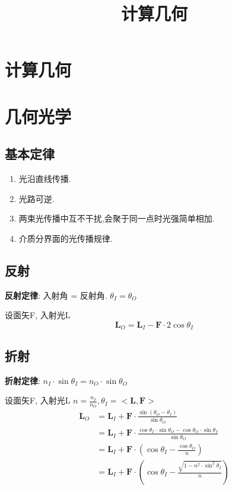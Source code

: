 \documentclass{article}
\title{计算几何}\date{} \linespread{1.25}
\begin{document}
\tableofcontents

\section{计算几何}

\section{几何光学}
    \subsection{基本定律}
        \begin{enumerate}
            \item 光沿直线传播.
            \item 光路可逆.
            \item 两束光传播中互不干扰,会聚于同一点时光强简单相加.
            \item 介质分界面的光传播规律.
        \end{enumerate}
    
    
    \subsection{反射}
        \textbf{反射定律}: 入射角 = 反射角. $\theta_I = \theta_O$
        
        设面矢\boldsymbol F, 入射光L
			$$\boldsymbol L_O = \boldsymbol L_I - \boldsymbol F·2 \cos \theta_I$$
			
    \subsection{折射}
        \textbf{折射定律}: $n_I·\sin \theta_I = n_O·\sin \theta_O$
            
			设面矢\boldsymbol F, 入射光L $n = \frac{n_I}{n_O}, \theta_I = <\boldsymbol L,\boldsymbol F>$
			\begin{align*}
    			\boldsymbol L_O &= \boldsymbol L_I + \boldsymbol F·\frac{\sin(\theta_O - \theta_I)}{\sin\theta_O}\\
    			   &= \boldsymbol L_I + \boldsymbol F· \frac{\cos\theta_I·\sin\theta_O - \cos\theta_O·\sin\theta_I}{\sin\theta_O}\\
    			   &= \boldsymbol L_I + \boldsymbol F· \left(\cos\theta_I - \frac{\cos\theta_O}{n}\right)\\
    			   &= \boldsymbol L_I + \boldsymbol F· \left( \cos\theta_I - \frac{\sqrt{1 - n^2·\sin^2\theta_I}}{n} \right)
			\end{align*}
	
\end{document}
